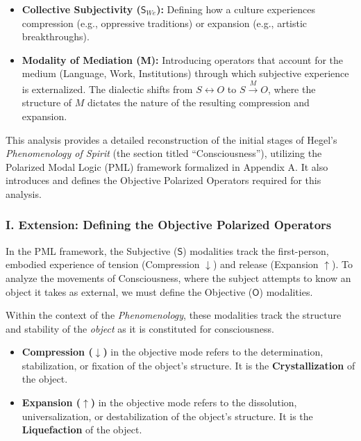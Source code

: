 \begin{itemize}
\tightlist
\item
  \textbf{Collective Subjectivity (\(\mathsf{S}_{We}\)):} Defining how a culture experiences compression (e.g., oppressive traditions) or expansion (e.g., artistic breakthroughs).
\item
  \textbf{Modality of Mediation (M):} Introducing operators that account for the medium (Language, Work, Institutions) through which subjective experience is externalized. The dialectic shifts from \(S \leftrightarrow O\) to \(S \xrightarrow{M} O\), where the structure of \(M\) dictates the nature of the resulting compression and expansion.
\end{itemize}

This analysis provides a detailed reconstruction of the initial stages of Hegel's \emph{Phenomenology of Spirit} (the section titled ``Consciousness''), utilizing the Polarized Modal Logic (PML) framework formalized in Appendix A. It also introduces and defines the Objective Polarized Operators required for this analysis.

\subsubsection{I. Extension: Defining the Objective Polarized Operators}\label{i.-extension-defining-the-objective-polarized-operators}

In the PML framework, the Subjective (\(\mathsf{S}\)) modalities track the first-person, embodied experience of tension (Compression \(\downarrow\)) and release (Expansion \(\uparrow\)). To analyze the movements of Consciousness, where the subject attempts to know an object it takes as external, we must define the Objective (\(\mathsf{O}\)) modalities.

Within the context of the \emph{Phenomenology}, these modalities track the structure and stability of the \emph{object} as it is constituted for consciousness.

\begin{itemize}
\tightlist
\item
  \textbf{Compression (\(\downarrow\))} in the objective mode refers to the determination, stabilization, or fixation of the object's structure. It is the \textbf{Crystallization} of the object.
\item
  \textbf{Expansion (\(\uparrow\))} in the objective mode refers to the dissolution, universalization, or destabilization of the object's structure. It is the \textbf{Liquefaction} of the object.
\end{itemize}

